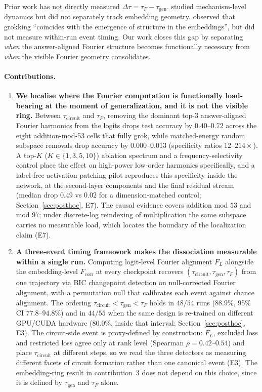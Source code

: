 \documentclass{article}
\newcommand{\taug}{\tau_{\mathrm{gen}}}
\newcommand{\tauf}{\tau_{F}}
\newcommand{\taucirc}{\tau_{\mathrm{circuit}}}
\newcommand{\Dtau}{\Delta\tau}
\newcommand{\fcorr}{F_{\mathrm{corr}}}
\newcommand{\flogit}{F_{L}}
\begin{document}
Prior work has not directly measured $\Dtau = \tauf - \taug$.
\citet{nanda2023progress} studied mechanism-level dynamics but did not
separately track embedding geometry.
\citet{liu2022towards} observed that grokking ``coincides with the
emergence of structure in the embeddings'', but did not measure
within-run event timing.
Our work closes this gap by separating \emph{when} the
answer-aligned Fourier structure becomes functionally necessary
from \emph{when} the visible Fourier geometry consolidates.

\paragraph{Contributions.}

\begin{enumerate}
  \item \textbf{We localise where the Fourier computation is
    functionally load-bearing at the moment of generalization, and
    it is not the visible ring.}
    Between $\taucirc$ and $\tauf$, removing the dominant top-$3$
    answer-aligned Fourier harmonics from the logits
    drops test accuracy by $0.40$--$0.72$ across the eight
    addition-mod-53 cells that fully grok, while matched-energy
    random subspace removals drop accuracy by $0.000$--$0.013$
    (specificity ratios $12$--$214\times$).
    A top-$K$ ($K\in\{1,3,5,10\}$) ablation spectrum and a
    frequency-selectivity control place the effect on high-power
    low-order harmonics specifically, and a label-free
    activation-patching pilot reproduces this specificity inside
    the network, at the second-layer components and the final
    residual stream (median drop $0.49$ vs $0.02$ for a
    dimension-matched control; Section~\ref{sec:posthoc}, E7).
    The causal evidence covers addition mod $53$ and mod $97$;
    under discrete-log reindexing of multiplication the same
    subspace carries no measurable load, which locates the
    boundary of the localization claim (E7).

  \item \textbf{A three-event timing framework makes the
    dissociation measurable within a single run.}
    Computing logit-level Fourier alignment $\flogit$ alongside
    the embedding-level $\fcorr$ at every checkpoint recovers
    $(\taucirc,\taug,\tauf)$ from one trajectory via BIC
    changepoint detection on null-corrected Fourier alignment,
    with a permutation null that calibrates each event against
    chance alignment.
    The ordering $\taucirc<\taug<\tauf$ holds in $48/54$ runs
    ($88.9\%$, 95\% CI $77.8$--$94.8\%$) and in $44/55$ when the
    same design is re-trained on different GPU/CUDA hardware
    ($80.0\%$, inside that interval;
    Section~\ref{sec:posthoc}, E3).
    The circuit-side event is proxy-defined by construction:
    $\flogit$, excluded loss and restricted loss
    \citep{nanda2023progress} agree only at rank level
    (Spearman $\rho{=}0.42$--$0.54$) and place $\taucirc$ at
    different steps, so we read the three detectors as measuring
    different facets of circuit formation rather than one
    canonical event (E3).
    The embedding-ring result in contribution~3 does not depend
    on this choice, since it is defined by $\taug$ and $\tauf$
    alone.


\end{enumerate}
\end{document}
